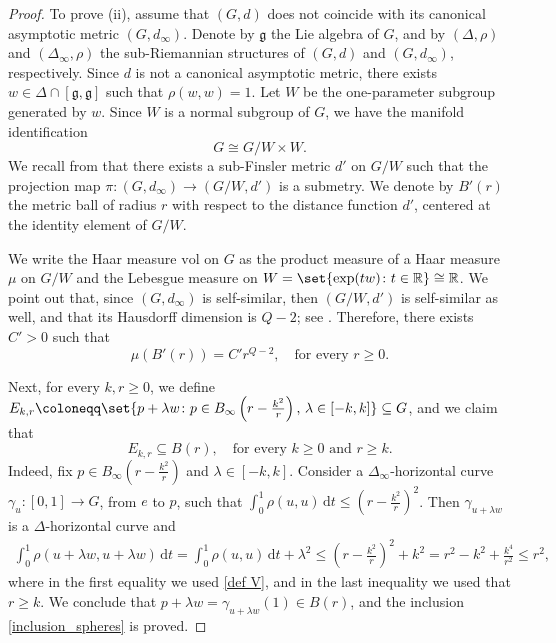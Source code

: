 \documentclass[a4paper,11pt,reqno]{amsart}
\theoremstyle{plain}
\theoremstyle{definition}
\newcommand{\R}{\mathbb R}
\newcommand{\g}{\mathfrak{g}}
\newcommand{\vol}{\mathrm{vol}}
\newcommand{\id}{e}
\newcommand{\de}{\mathrm{d}}
\newcommand{\coloneq}{\coloneqq}
\begin{document}
\begin{proof}
 To prove (ii), assume that $(G,d)$ does not coincide with its canonical asymptotic metric $(G,d_\infty)$. Denote by $\g$ the Lie algebra of $G$, and by $(\Delta,\rho)$ and $(\Delta_\infty,\rho)$ the sub-Riemannian structures of $(G,d)$ and $(G,d_\infty)$, respectively. Since $d$ is not a canonical asymptotic metric, there exists $w \in \Delta \cap [\g,\g]$ such that $\rho(w,w)=1$. Let $W$ be the one-parameter subgroup generated by $w$. Since $W$ is a normal subgroup of $G$, we have the manifold identification 
 \begin{equation*}
 G \cong G/W \times W.
 \end{equation*}
 We recall from \cite[Proposition~7.1.9]{donne2024metricliegroupscarnotcaratheodory} that there exists a sub-Finsler metric $d'$ on $G/W$ such that the projection map $\pi \colon (G,d_\infty) \to (G/W,d')$ is a submetry. We denote by $B'(r)$ the metric ball of radius $r$ with respect to the distance function $d'$, centered at the identity element of $G/W$.

 We write the Haar measure $\vol$ on $G$ as the product measure of a Haar measure $\mu$ on $G/W$ and the Lebesgue measure on $W = \set{\exp(tw) \colon t \in \R} \cong \R$. We point out that, since $(G,d_\infty)$ is self-similar, then $(G/W, d')$ is self-similar as well, and that its Hausdorff dimension is $Q-2$; see \cite[Corollary~4.3.6]{donne2024metricliegroupscarnotcaratheodory}. Therefore, there exists $C'>0$ such that
 \begin{equation} \label{volume_proj}
 \mu \left(B'(r) \right) = C' r^{Q-2}, \quad \text{for every $r \ge 0$.}
 \end{equation}

 Next, for every $k,r \ge 0$, we define
 $E_{k,r} \coloneq \set{ p + \lambda w \colon p \in B_\infty\left( r - \tfrac{k^2}{r}\right), \, \lambda \in [-k,k] } \subseteq G$, and we claim that
 \begin{equation} \label{inclusion_spheres}
 E_{k,r} \subseteq B(r), \quad \text{for every $k \ge 0$ and $r \ge k$.}
 \end{equation}
 Indeed, fix $p \in B_\infty\left( r - \tfrac{k^2}{r}\right)$ and $\lambda \in [-k,k]$. Consider a $\Delta_\infty$-horizontal curve $\gamma_u \colon [0,1] \to G$, from $\id$ to $p$, such that $\int^1_0 \rho(u,u) \, \de t \le \left(r - \frac{k^2}{r}\right)^2$. Then $\gamma_{u+\lambda w}$ is a $\Delta$-horizontal curve and
 \begin{align*}
 \int^1_0 \rho(u+\lambda w, u+\lambda w) \, \de t = \int^1_0 \rho(u,u) \, \de t + \lambda^2 \le \left(r - \frac{k^2}{r}\right)^2 + k^2 = r^2 - k^2 + \frac{k^4}{r^2} \le r^2,
 \end{align*}
 where in the first equality we used \eqref{def V}, and in the last inequality we used that $r \ge k$.
 We conclude that $p+\lambda w = \gamma_{u+\lambda w}(1) \in B(r)$, and the inclusion \eqref{inclusion_spheres} is proved.


\end{proof}
\end{document}
